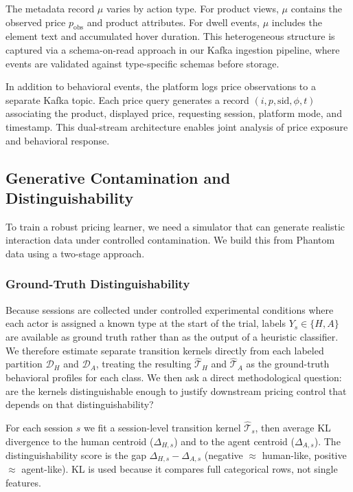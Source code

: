 The metadata record $\mu$ varies by action type. For product views, $\mu$ contains the observed price $p_{\text{obs}}$ and product attributes. For dwell events, $\mu$ includes the element text and accumulated hover duration. This heterogeneous structure is captured via a schema-on-read approach in our Kafka ingestion pipeline, where events are validated against type-specific schemas before storage.

In addition to behavioral events, the platform logs price observations to a separate Kafka topic. Each price query generates a record $(i, p, \text{sid}, \phi, t)$ associating the product, displayed price, requesting session, platform mode, and timestamp. This dual-stream architecture enables joint analysis of price exposure and behavioral response.




\subsection{Generative Contamination and Distinguishability}

To train a robust pricing learner, we need a simulator that can generate realistic interaction data under controlled contamination. We build this from Phantom data using a two-stage approach.


\subsubsection{Ground-Truth Distinguishability}
Because sessions are collected under controlled experimental conditions where each actor is assigned a known type at the start of the trial, labels $Y_s \in \{H, A\}$ are available as ground truth rather than as the output of a heuristic classifier. We therefore estimate separate transition kernels directly from each labeled partition $\mathcal{D}_H$ and $\mathcal{D}_A$, treating the resulting $\hat{\mathcal{T}}_H$ and $\hat{\mathcal{T}}_A$ as the ground-truth behavioral profiles for each class. We then ask a direct methodological question: are the kernels distinguishable enough to justify downstream pricing control that depends on that distinguishability?

For each session $s$ we fit a session-level transition kernel $\hat{\mathcal{T}}_s$, then average KL divergence to the human centroid ($\Delta_{H,s}$) and to the agent centroid ($\Delta_{A,s}$). The distinguishability score is the gap $\Delta_{H,s} - \Delta_{A,s}$ (negative $\approx$ human-like, positive $\approx$ agent-like). KL is used because it compares full categorical rows, not single features.

